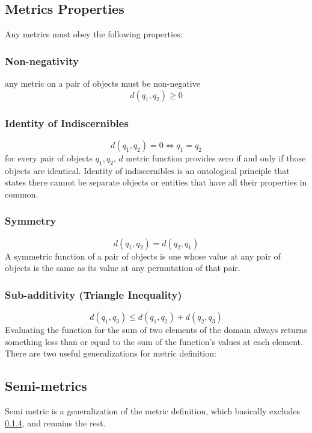 \subsection{Metrics Properties}
Any metrics must obey the following properties:

\subsubsection{Non-negativity}  \label{sec:1}
any metric on a pair of objects must be non-negative
\begin{equation}
d(q_1,q_2) \geq 0
\end{equation}

\subsubsection{Identity of Indiscernibles}  \label{sec:2}
\begin{equation}
d(q_1,q_2) = 0 \iff q_1 = q_2
\end{equation}
for every pair of objects $q_1,q_2$, $d$ metric function provides zero if and only if those objects are identical.
Identity of indiscernibles is an ontological principle that states there cannot be separate objects or entities that have all their properties in common.


\subsubsection{Symmetry} \label{sec:3}
\begin{equation}
d(q_1,q_2) = d(q_2,q_1)
\end{equation}
A symmetric function of a pair of objects is one whose value at any pair of objects is the same as its value at any permutation of that pair. 

\subsubsection{Sub-additivity (Triangle Inequality)} \label{sec:4}
\begin{equation}
d(q_1,q_3) \leq d(q_1,q_2) + d(q_2,q_3)
\end{equation}
Evaluating the function for the sum of two elements of the domain always returns something less than or equal to the sum of the function's values at each element. 
\\
There are two useful generalizations for metric definition:

\subsection{Semi-metrics}
Semi metric is a generalization of the metric definition, which basically excludes \ref{sec:4}, and remains the rest.
